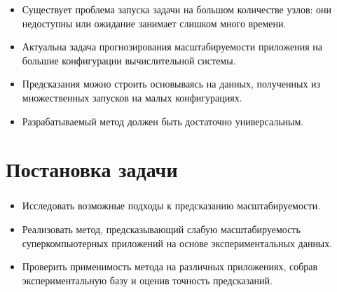 \documentclass[unicode, t, 11pt]{beamer}%
\begin{document}
\begin{frame}
\begin{itemize}[label = \(\bullet\)]
		\item Существует проблема запуска задачи на большом количестве узлов: они недоступны или ожидание занимает слишком много времени.

		\item Актуальна задача прогнозирования масштабируемости приложения на большие конфигурации вычислительной системы.

		\item Предсказания можно строить основываясь на данных, полученных из множественных запусков на малых конфигурациях.


		\item Разрабатываемый метод должен быть достаточно универсальным.

		\end{itemize}
		\end{frame}

	\section{Постановка задачи}
		\begin{frame}
			\frametitle{\insertsection}
			\begin{itemize}[label=\(\bullet\)]
				\item Исследовать возможные подходы к предсказанию масштабируемости.
				\item Реализовать метод, предсказывающий слабую масштабируемость суперкомпьютерных приложений на основе экспериментальных данных.
				\item Проверить применимость метода на различных приложениях, собрав экспериментальную базу и оценив точность предсказаний.
			\end{itemize}
		\end{frame}
\end{document}
